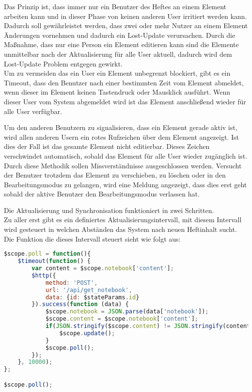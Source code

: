 Das Prinzip ist, dass immer nur ein Benutzer des Heftes an einem Element arbeiten kann und in dieser Phase von keinen anderen User irritiert werden kann. Dadurch soll gewährleistet werden, dass zwei oder mehr Nutzer an einem Element Änderungen vornehmen und dadurch ein Lost-Update verursachen. Durch die Maßnahme, dass nur eine Person ein Element editieren kann sind die Elemente unmittelbar nach der Aktualisierung für alle User aktuell, dadurch wird dem Lost-Update Problem entgegen gewirkt.\\
Um zu vermeiden das ein User ein Element unbegrenzt blockiert, gibt es ein Timeout, dass den Benutzer nach einer bestimmten Zeit vom Element abmeldet, wenn dieser im Element keinen Tastendruck oder Mausklick ausführt. Wenn dieser User vom System abgemeldet wird ist das Element anschließend wieder für alle User verfügbar.

Um den anderen Benutzern zu signalisieren, dass ein Element gerade aktiv ist, wird allen anderen Usern ein rotes Rufzeichen über dem Element angezeigt. Ist dies der Fall ist das gesamte Element nicht editierbar. 
Dieses Zeichen verschwindet automatisch, sobald das Element für alle User wieder zugänglich ist. Durch diese Methodik sollen Missverständnisse ausgeschlossen werden. Versucht der Benutzer trotzdem das Element zu verschieben, zu löschen oder in den Bearbeitungsmodus zu gelangen, wird eine Meldung angezeigt, dass dies erst geht sobald der aktive Benutzer den Bearbeitungsmodus verlassen hat. 

Die Aktualisierung und Synchronisation funktioniert in zwei Schritten.\\
Zu aller erst gibt es ein definiertes Aktualisierungsintervall, mit diesem Intervall wird gesteuert in welchen Abständen das System nach neuen Heftinhalt sucht. Die Funktion die dieses Intervall steuert sieht wie folgt aus:
\begin{lstlisting}[caption={Aktualisierung - PWS}, language=Javascript]
$scope.poll = function(){
    $timeout(function() {
        var content = $scope.notebook['content'];
        $http({
            method: 'POST',
            url: '/api/get_notebook',
            data: {id: $stateParams.id}
        }).success(function (data) {
            $scope.notebook = JSON.parse(data['notebook']);
            $scope.content = $scope.notebook['content'];
            if(JSON.stringify($scope.content) != JSON.stringify(content)) {
                $scope.update();
            }
            $scope.poll();
        });
    }, 10000);
};

$scope.poll();
\end{lstlisting}

